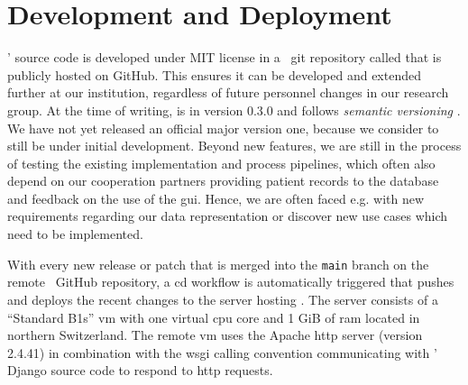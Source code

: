 \documentclass[\relativeRoot/main.tex]{subfiles}
\begin{document}
\section{Development and Deployment}
\label{sec:lyprox:dev}

\inlinelyproxlogo{}' source code is developed under MIT license in a ~git \cite{torvalds_git_2022} repository called  that is publicly hosted on GitHub. This ensures it can be developed and extended further at our institution, regardless of future personnel changes in our research group. At the time of writing, \inlinelyproxlogo{} is in version 0.3.0 and follows \emph{semantic versioning} \cite{preston-werner_semantic_nodate}. We have not yet released an official major version one, because we consider \inlinelyproxlogo{} to still be under initial development. Beyond new features, we are still in the process of testing the existing implementation and process pipelines, which often also depend on our cooperation partners providing patient records to the database and feedback on the use of the \gls{gui}. Hence, we are often faced e.g. with new requirements regarding our data representation or discover new use cases which need to be implemented.

With every new release or patch that is merged into the \texttt{main} branch on the remote ~GitHub repository, a \acrlong{cd} workflow is automatically triggered that pushes and deploys the recent changes to the server hosting \inlinelyproxlogo{}. The server consists of a  ``Standard B1s'' \acrlong{vm} with one virtual \acrshort{cpu} core and 1 GiB of \acrshort{ram} located in northern Switzerland. The remote \acrlong{vm} uses the Apache \acrshort{http} server (version 2.4.41) \cite{mccool_apache_nodate} in combination with the \acrshort{wsgi} calling convention \cite{eby_python_2010} communicating with \inlinelyproxlogo{}' Django source code to respond to \acrshort{http} requests.
\end{document}
